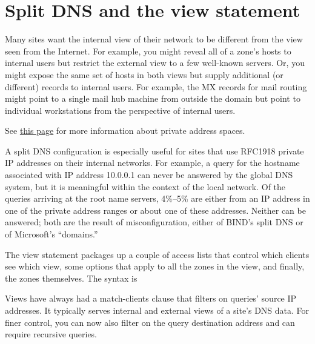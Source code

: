 


\section{Split DNS and the view statement}

Many sites want the internal view of their network to be different from
the view seen from the Internet. For example, you might reveal all of a
zone's hosts to internal users but restrict the external view to a few
well-known servers. Or, you might expose the same set of hosts in both
views but supply additional (or different) records to internal users.
For example, the MX records for mail routing might point to a single
mail hub machine from outside the domain but point to individual
workstations from the perspective of internal users.

\leavevmode\hypertarget{part0024_split_046.htmlux5cux23_idContainer1003}{}%
See
\protect\hyperlink{part0021_split_021.htmlux5cux23_idTextAnchor657}{this
page} for more information about private address spaces.

A split DNS configuration is especially useful for sites that use
\protect\hypertarget{part0024_split_046.htmlux5cux23_idIndexMarker2210}{}{}RFC1918
private IP addresses on their internal networks. For example, a query
for the hostname associated with IP address 10.0.0.1 can never be
answered by the global DNS system, but it is meaningful within the
context of the local network.
\protect\hypertarget{part0024_split_046.htmlux5cux23_idIndexMarker2211}{}{}Of
the queries arriving at the root name servers, 4\%--5\% are either
{from} an IP address in one of the private address ranges or {about} one
of these addresses. Neither can be answered; both are the result of
misconfiguration, either of BIND's split DNS or of Microsoft's
``domains.''

The
\protect\hypertarget{part0024_split_046.htmlux5cux23_idIndexMarker2212}{}{}{view}
statement packages up a couple of access lists that control which
clients see which view, some options that apply to all the zones in the
view, and finally, the zones themselves. The syntax is


Views have always had a {match-clients} clause that filters on queries'
source IP addresses. It typically serves internal and external views of
a site's DNS data. For finer control, you can now also filter on the
query destination address and can require recursive queries.

